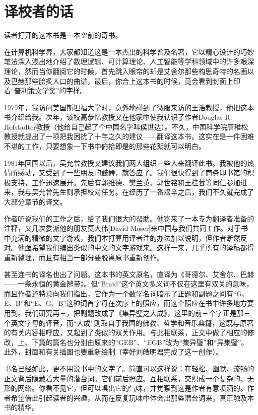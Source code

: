 
\chapter{译校者的话}

读者打开的这本书是一本空前的奇书。

在计算机科学界，大家都知道这是一本杰出的科学普及名著，它以精心设计的巧妙笔法深入浅出地介绍了数理逻辑、可计算理论、人工智能等学科领域中的许多艰深理论，然而当你翻阅它的时候，首先跳入眼帘的却是艾舍尔那些构思奇特的名画以及巴赫那些脍炙人口的曲谱，最后，你合上这本书的时候，竟会看到封面上印着“普利策文学奖”的字样。

1979年，我访问美国斯坦福大学时，意外地碰到了微服来访的王浩教授，他把这本书介绍给我。次年，该校高恭忆教授又在他家中使我认识了作者Douglas R. Hofstadter教授（他给自己起了个中国名字叫侯世达）。不久，中国科学院唐稚松教授就提出了一项把我困扰了十年之久的建议——翻译这本书。这实在是一件困难不堪的工作，只要想象一下书中俯拾即是的那些花絮就可以明白。

1981年回国以后，吴允曾教授又建议我们两人组织一些人来翻译此书。我被他的热情所感动，又受到了一些朋友的鼓舞，就答应了。我们很快得到了商务印书馆的积极支持，工作迅速展开。先后有郭维德、樊兰英、郭世铭和王桂蓉等同仁参加进来，我与吴允曾先生则承担校对任务。在经历了一番艰辛之后，我们不久就完成了大部分章节的译文。

作者听说我们的工作之后，给了我们很大的帮助。他寄来了一本专为翻译者准备的注释，又几次委派他的朋友莫大伟[David Moser]来中国与我们共同工作。对于书中充满的精微的文字游戏，我们本打算用译者注的办法加以说明，但作者断然反对。他亟希望我们编出类似的中文的文字游戏来。这样一来，几乎所有的译稿都得重新整理，而且有相当一部分要脱离原书重新创作。

甚至连书的译名也出了问题。这本书的英文原名，直译为《哥德尔、艾舍尔、巴赫——一条永恒的黄金辫带》。但“Braid”这个英文多义词不仅在这里有双关的意味，而且作者还特意向我们指出，它作为一个数学名词暗示了正题和副题之间有“G、E、B”和“E、G、B”这种词首字母在次序上的照应，而这个照应在书中许多地方要用到。我们研究再三，把副题改成了《集异璧之大成》，这里的前三个字正是那三个英文字母的译音，而“大成”则取自于我国的佛教、哲学和音乐典籍，这既与原著的有关内容相呼应，又起到了类似的双关作用。与此相联系，正文中做了相应的修改，上、下篇的篇名也分别由原来的“GEB”、“EGB”改为“集异璧”和“异集璧”。此外，封面和有关插图也要重新绘制（幸好刘皓明君完成了这一创作）。

书名已经如此，更不用说书中的文字了。简直可以这样说：在轻松、幽默、流畅的正文背后隐藏着大量的潜台词。它们前后照应、互相联系，交织成一个复杂的、无形的网络。你看不见它，但可以嗅出它的气味，并觉察到这是作者有意喷洒的。作者希望借此引起读者的兴趣，从而在反复玩味中体会出那些潜台词来，真正触及本书的精华。

